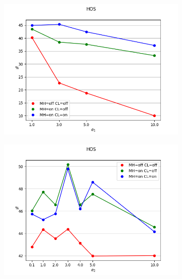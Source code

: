 \documentclass[10pt,twocolumn,letterpaper]{article}
\begin{document}
\begin{figure}[!htb]
  \centering
  \begin{subfigure}[!htb]{0.35\textwidth}
    \includegraphics[trim=0 0 0 2cm, clip, width=\linewidth]{hos-a1.png}
  \end{subfigure}
  \begin{subfigure}[!htb]{0.35\textwidth}
    \includegraphics[trim=0 0 0 2cm, clip, width=\linewidth]{hos-a2.png}
  \end{subfigure}
  \begin{subfigure}[!htb]{0.35\textwidth}

\end{subfigure}
\end{figure}
\end{document}
